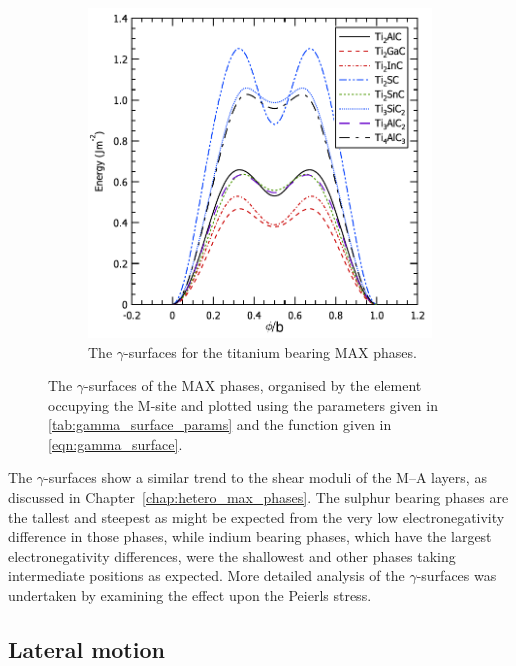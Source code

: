 \begin{figure}[!htb]
\begin{subfigure}{5cm}
\centering
\includegraphics[width=\textwidth]{Ti_gamma_surfaces}
\caption{The $\gamma$-surfaces for the titanium bearing MAX phases.\label{fig:Ti_gamma_surfaces}}
\end{subfigure}

\captionsetup{width=12cm}
\caption[The \texorpdfstring{$\gamma$}{gamma}-surfaces of the MAX phases.]{The $\gamma$-surfaces of the MAX phases, organised by the element occupying the M-site and plotted using the parameters given in \autoref{tab:gamma_surface_params} and the function given in \autoref{eqn:gamma_surface}. \label{fig:gamma_surfaces}}
\end{figure}


The $\gamma$-surfaces show a similar trend to the shear moduli of the M--A layers, as discussed in Chapter~\ref{chap:hetero_max_phases}. The sulphur bearing phases are the tallest and steepest as might be expected from the very low electronegativity difference in those phases, while indium bearing phases, which have the largest electronegativity differences, were the shallowest and other phases taking intermediate positions as expected. More detailed analysis of the $\gamma$-surfaces was undertaken by examining the effect upon the Peierls stress.


\subsection{Lateral motion}



